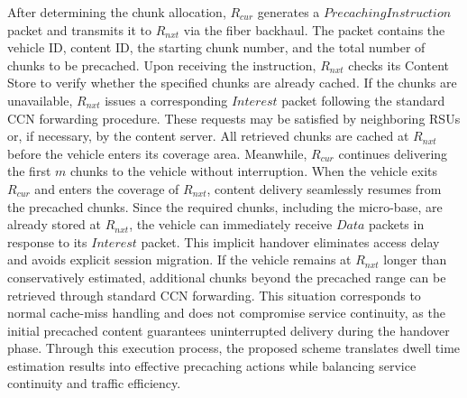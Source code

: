 \documentclass[journal]{IEEEtran}
\begin{document}
After determining the chunk allocation, $R_{cur}$ generates a \(Precaching Instruction\) packet and transmits it to $R_{nxt}$ via the fiber backhaul.
The packet contains the vehicle ID, content ID, the starting chunk number, and the total number of chunks to be precached.
Upon receiving the instruction, $R_{nxt}$ checks its Content Store to verify whether the specified chunks are already cached.
If the chunks are unavailable, $R_{nxt}$ issues a corresponding \(Interest\) packet following the standard CCN forwarding procedure.
These requests may be satisfied by neighboring RSUs or, if necessary, by the content server.
All retrieved chunks are cached at $R_{nxt}$ before the vehicle enters its coverage area.
Meanwhile, $R_{cur}$ continues delivering the first $m$ chunks to the vehicle without interruption.
When the vehicle exits $R_{cur}$ and enters the coverage of $R_{nxt}$, content delivery seamlessly resumes from the precached chunks.
Since the required chunks, including the micro-base, are already stored at $R_{nxt}$, the vehicle can immediately receive \(Data\) packets in response to its \(Interest\) packet.
This implicit handover eliminates access delay and avoids explicit session migration.
If the vehicle remains at $R_{nxt}$ longer than conservatively estimated, additional chunks beyond the precached range can be retrieved through standard CCN forwarding.
This situation corresponds to normal cache-miss handling and does not compromise service continuity, as the initial precached content guarantees uninterrupted delivery during the handover phase.
Through this execution process, the proposed scheme translates dwell time estimation results into effective precaching actions while balancing service continuity and traffic efficiency.
\end{document}
